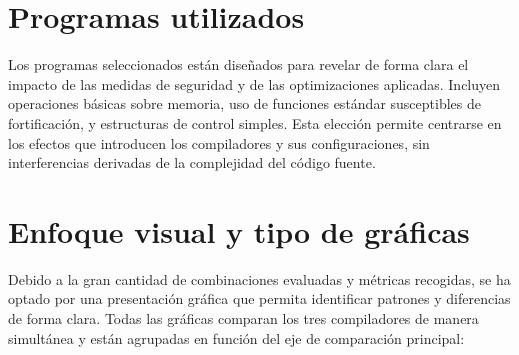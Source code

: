 \section{Programas utilizados}

Los programas seleccionados están diseñados para revelar de
forma clara el impacto de las medidas de seguridad y de las
optimizaciones aplicadas. Incluyen operaciones básicas sobre memoria,
uso de funciones estándar susceptibles de fortificación, y estructuras
de control simples. Esta elección permite centrarse en los efectos que
introducen los compiladores y sus configuraciones, sin interferencias
derivadas de la complejidad del código fuente.

\section{Enfoque visual y tipo de gráficas}

Debido a la gran cantidad de combinaciones evaluadas y métricas
recogidas, se ha optado por una presentación gráfica que permita
identificar patrones y diferencias de forma clara. Todas las gráficas
comparan los tres compiladores de manera simultánea y están agrupadas en
función del eje de comparación principal:


